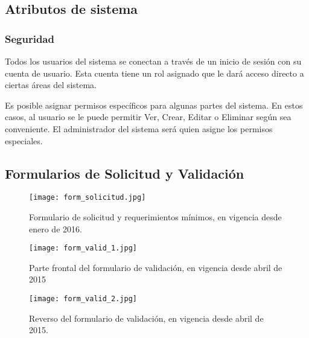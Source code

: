 \documentclass[11pt]{report}
\begin{document}
	\section{Atributos de sistema}
	\subsection{Seguridad}
	Todos los usuarios del sistema se conectan a través de un inicio de sesión con su cuenta de usuario. Esta cuenta tiene un rol asignado que le dará acceso directo a ciertas áreas del sistema.
	
	Es posible asignar permisos específicos para algunas partes del sistema. En estos casos, al usuario se le puede permitir Ver, Crear, Editar o Eliminar según sea conveniente. El administrador del sistema será quien asigne los permisos especiales.
	
	\begin{appendices}
		\chapter{Formularios de Solicitud y Validación}
		\begin{figure}[bh!]
		\centering
		\caption[Formulario de solicitud]{Formulario de solicitud y requerimientos mínimos, en vigencia desde enero de 2016.}
		\label{form_solicitud}
		\texttt{[image: form\_solicitud.jpg]}
		\end{figure}
		
		\begin{figure}[h]
		\centering
		\caption[Formulario de validación]{Parte frontal del formulario de validación, en vigencia desde abril de 2015}
		\label{form_valid_1}
		\texttt{[image: form\_valid\_1.jpg]}
		\end{figure}
		
		\begin{figure}[h]
			\centering
			\caption[Formulario de validación]{Reverso del formulario de validación, en vigencia desde abril de 2015.}
			\label{form_valid_2}
			\texttt{[image: form\_valid\_2.jpg]}
		\end{figure}

	\end{appendices}
	
\end{document}
